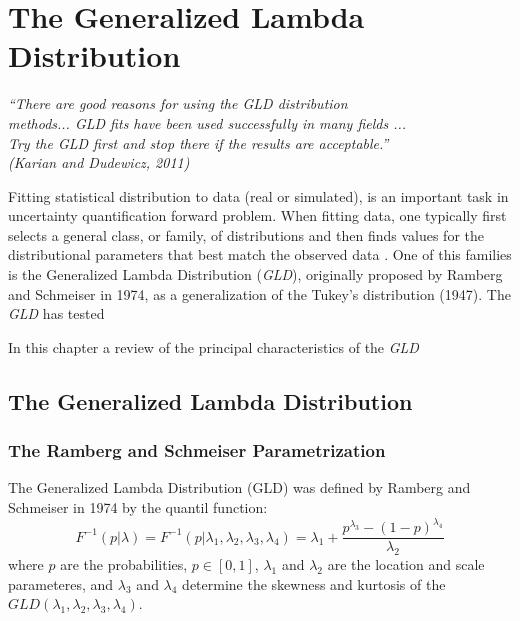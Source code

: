 \chapter[The Generalized Lambda Distribution]{The Generalized Lambda Distribution}\label{cap:gld}

\begin{flushright}
	\textit{``There are good reasons for using the GLD distribution \\
	methods... GLD fits have been used successfully in many fields ...\\
	Try the GLD first and stop there if the results are acceptable.''\\
	(Karian and Dudewicz, 2011)}
\end{flushright}


Fitting statistical distribution to data (real or simulated), is an important task in uncertainty quantification forward problem. When fitting data, one typically first selects a general class, or family, of distributions and then finds values for the distributional parameters that best match the observed data \cite{Lakhany2000}. One of this families is the Generalized Lambda Distribution (\textit{GLD}), originally proposed by Ramberg and Schmeiser in 1974, as a generalization of the Tukey's distribution (1947). The \textit{GLD} has tested 

In this chapter a review of the principal characteristics of the \textit{GLD}

\section{The Generalized Lambda Distribution}

\subsection{The Ramberg and Schmeiser Parametrization}
The Generalized Lambda Distribution (GLD) was defined by Ramberg and Schmeiser in 1974 by the quantil function:
\begin{equation}
F^{-1}(p|\lambda)=F^{-1}(p|\lambda_{1}, \lambda_{2}, \lambda_{3}, \lambda_{4})=\lambda_{1}+\frac{p^{\lambda_{3}}-(1-p)^{\lambda_{4}}}{\lambda_{2}}
\end{equation}
where $p$ are the probabilities, $p\in[0,1]$, $\lambda_{1}$ and $\lambda_{2}$ are the location and scale parameteres, and $\lambda_{3}$ and $\lambda_{4}$ determine the skewness and kurtosis of the $GLD(\lambda_{1}, \lambda_{2}, \lambda_{3}, \lambda_{4})$.

